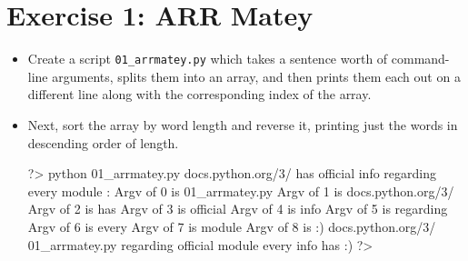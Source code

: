 \documentclass{42-en}
\begin{document}
\nextexercice
\newpage


\chapter{Exercise 1: ARR Matey}
\makeheaderfiles

\begin{itemize}

\item Create a script \texttt{01\_arrmatey.py} which takes a sentence worth of command-line arguments, splits them into an array, and then prints them each out on a different line along with the corresponding index of the array.
\item Next, sort the array by word length and reverse it, printing just the words in descending order of length.

\begin{42console}
	?> python 01_arrmatey.py docs.python.org/3/ has official info regarding every module :\)
	Argv of 0 is 01_arrmatey.py
	Argv of 1 is docs.python.org/3/
	Argv of 2 is has
	Argv of 3 is official
	Argv of 4 is info
	Argv of 5 is regarding
	Argv of 6 is every
	Argv of 7 is module
	Argv of 8 is :)
	docs.python.org/3/
	01_arrmatey.py
	regarding
	official
	module
	every
	info
	has
	:)
	?>
\end{42console}

\end{itemize}

\nextexercice
\newpage

\end{document}
